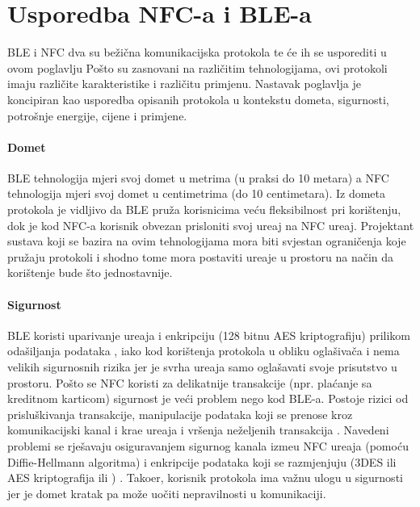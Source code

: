 


\chapter{Usporedba NFC-a i BLE-a}


BLE i NFC dva su be\v{z}i\v{c}na komunikacijska protokola te \'{c}e ih se usporediti u ovom poglavlju Po\v{s}to su zasnovani na razli\v{c}itim tehnologijama, ovi protokoli imaju razli\v{c}ite karakteristike i razli\v{c}itu primjenu. 
Nastavak poglavlja je koncipiran kao usporedba opisanih protokola u kontekstu dometa, sigurnosti, potro\v{s}nje energije, cijene i primjene. 

\subsubsection{Domet}

BLE tehnologija mjeri svoj domet u metrima (u praksi do 10 metara) a NFC tehnologija mjeri svoj domet u centimetrima (do 10 centimetara). Iz dometa protokola je vidljivo da BLE pru\v{z}a korisnicima ve\'{c}u fleksibilnost pri kori\v{s}tenju, dok je kod NFC-a korisnik obvezan prisloniti svoj ure\dj aj na NFC ure\dj aj. Projektant sustava koji se bazira na ovim tehnologijama mora biti svjestan ograni\v{c}enja koje pru\v{z}aju protokoli i shodno tome mora postaviti ure\dj aje u prostoru na na\v{c}in da kori\v{s}tenje bude \v{s}to jednostavnije.

\subsubsection{Sigurnost}

BLE koristi uparivanje ure\dj aja i enkripciju (128 bitnu AES kriptografiju) prilikom oda\v{s}iljanja podataka  \cite{bleSecurity}, iako kod kori\v{s}tenja protokola u obliku ogla\v{s}iva\v{c}a i nema velikih sigurnosnih rizika jer je svrha ure\dj aja samo ogla\v{s}avati svoje prisutstvo u prostoru. Po\v{s}to se NFC koristi za delikatnije transakcije (npr. pla\'{c}anje sa kreditnom karticom) sigurnost je ve\'{c}i problem nego kod BLE-a. Postoje rizici od prislu\v{s}kivanja transakcije, manipulacije podataka koji se prenose kroz komunikacijski kanal i kra\dj e ure\dj aja i vr\v{s}enja ne\v{z}eljenih transakcija \cite{nfcSecurity}. Navedeni problemi se rje\v{s}avaju osiguravanjem sigurnog kanala izme\dj u NFC ure\dj aja (pomo\'{c}u Diffie-Hellmann algoritma) i enkripcije podataka koji se razmjenjuju (3DES ili AES kriptografija ili ) \cite{nfcSecurityTwo}. Tako\dj er, korisnik protokola ima va\v{z}nu ulogu u sigurnosti jer je domet kratak pa mo\v{z}e uo\v{c}iti nepravilnosti u komunikaciji.

